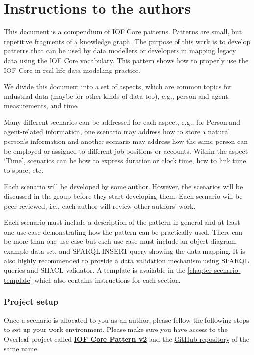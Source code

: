 \chapter{Instructions to the authors}

This document is a compendium of IOF Core patterns. Patterns are small, but repetitive fragments of a knowledge graph. The purpose of this work is to develop patterns that can be used by data modellers or developers in mapping legacy data using the IOF Core vocabulary. This pattern shows how to properly use the IOF Core in real-life data modelling practice. 

We divide this document into a set of aspects, which are common topics for industrial data (maybe for other kinds of data too), e.g., person and agent, measurements, and time. 

Many different scenarios can be addressed for each aspect, e.g., for Person and agent-related information, one scenario may address how to store a natural person's information and another scenario may address how the same person can be employed or assigned to different job positions or accounts. Within the aspect `Time', scenarios can be how to express duration or clock time, how to link time to space, etc. 

Each scenario will be developed by some author. However, the scenarios will be discussed in the group before they start developing them. Each scenario will be peer-reviewed, i.e., each author will review other authors' work.   

Each scenario must include a description of the pattern in general and at least one use case demonstrating how the pattern can be practically used. There can be more than one use case but each use case must include an object diagram, example data set, and SPARQL INSERT query showing the data mapping. It is also highly recommended to provide a data validation mechanism using SPARQL queries and SHACL validator. A template is available in the \cref{chapter-scenario-template} which also contains instructions for each section. 

\subsection*{Project setup}

Once a scenario is allocated to you as an author, please follow the following steps to set up your work environment. 
Please make sure you have access to the Overleaf project called \textbf{\href{https://www.overleaf.com/project/675089944acddad8118ab6f8}{IOF Core Pattern v2}} and the \href{https://github.com/iofoundry/IOF-Core-Pattern-v2}{GitHub repository} of the same name. 

